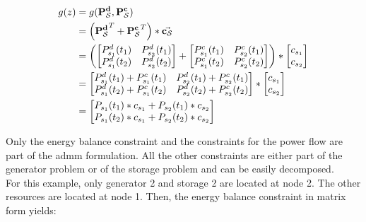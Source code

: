 \begin{subequations}
	\begin{align}
		g(z) &= g(\vb{P_\mathcal{S}^d}, \vb{P_\mathcal{S}^c})\\
		& = \left(\vb{P_\mathcal{S}^d}^T + \vb{P_\mathcal{S}^c}^T\right) * \va{c_\mathcal{S}} \\
		& = \left(\begin{bmatrix}
			P_{s_1}^d(t_1) & P_{s_2}^d(t_1) \\
			P_{s_1}^d(t_2) & P_{s_2}^d(t_2)
		\end{bmatrix} + \begin{bmatrix}
			P_{s_1}^c(t_1) & P_{s_2}^c(t_1) \\
			P_{s_1}^c(t_2) & P_{s_2}^c(t_2)
		\end{bmatrix} \right) * \begin{bmatrix}
			c_{s_1} \\
			c_{s_2}
		\end{bmatrix} \\
		& = \begin{bmatrix}
			P_{s_1}^d(t_1) + P_{s_1}^c(t_1) & P_{s_2}^d(t_1) + P_{s_2}^c(t_1) \\
			P_{s_1}^d(t_2) + P_{s_1}^c(t_2) & P_{s_2}^d(t_2) + P_{s_2}^c(t_2)
		\end{bmatrix} * \begin{bmatrix}
			c_{s_1} \\
			c_{s_2}
		\end{bmatrix} \\
		& = \begin{bmatrix}
			P_{s_1}(t_1) * c_{s_1} + P_{s_2}(t_1) * c_{s_2} \\
			P_{s_1}(t_2) * c_{s_1} + P_{s_2}(t_2) * c_{s_2} \\
		\end{bmatrix}
	\end{align}
\end{subequations}

Only the energy balance constraint and the constraints for the power flow are part of the \gls{admm} formulation. All the other constraints are either part of the generator problem or of the storage problem and can be easily decomposed. \\

For this example, only generator 2 and storage 2 are located at node 2. The other resources are located at node 1. Then, the energy balance constraint in matrix form yields:

